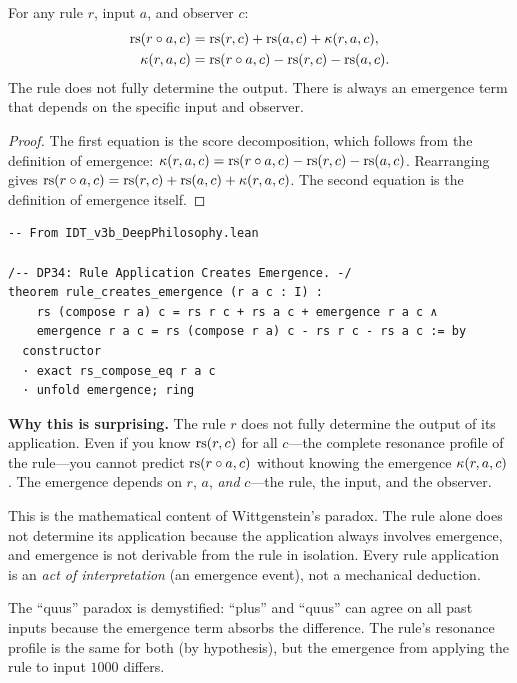 \begin{theorem}
\label{thm:rule-creates-emergence}
For any rule $r$, input $a$, and observer $c$:
\begin{align}
\mathrm{rs}(r \circ a, c) &= \mathrm{rs}(r, c) + \mathrm{rs}(a, c) + \kappa(r, a, c), \\
\kappa(r, a, c) &= \mathrm{rs}(r \circ a, c) - \mathrm{rs}(r, c) - \mathrm{rs}(a, c).
\end{align}
The rule does not fully determine the output.  There is always an
emergence term that depends on the specific input and observer.
\end{theorem}

\begin{proof}
The first equation is the score decomposition, which follows from the
definition of emergence:
$\kappa(r, a, c) = \mathrm{rs}(r \circ a, c) - \mathrm{rs}(r, c) - \mathrm{rs}(a, c)$.
Rearranging gives $\mathrm{rs}(r \circ a, c) = \mathrm{rs}(r, c) + \mathrm{rs}(a, c) + \kappa(r, a, c)$.
The second equation is the definition of emergence itself.
\end{proof}

\begin{lstlisting}
-- From IDT_v3b_DeepPhilosophy.lean

/-- DP34: Rule Application Creates Emergence. -/
theorem rule_creates_emergence (r a c : I) :
    rs (compose r a) c = rs r c + rs a c + emergence r a c ∧
    emergence r a c = rs (compose r a) c - rs r c - rs a c := by
  constructor
  · exact rs_compose_eq r a c
  · unfold emergence; ring
\end{lstlisting}

\begin{surprisebox}
\noindent\textbf{Why this is surprising.}
The rule $r$ does not fully determine the output of its application.
Even if you know $\mathrm{rs}(r, c)$ for all $c$---the complete resonance
profile of the rule---you cannot predict $\mathrm{rs}(r \circ a, c)$
without knowing the emergence $\kappa(r, a, c)$.  The emergence
depends on $r$, $a$, \emph{and} $c$---the rule, the input, and the
observer.

This is the mathematical content of Wittgenstein's paradox.  The rule
alone does not determine its application because the application always
involves emergence, and emergence is not derivable from the rule in
isolation.  Every rule application is an \emph{act of interpretation}
(an emergence event), not a mechanical deduction.

The ``quus'' paradox is demystified: ``plus'' and ``quus'' can agree
on all past inputs because the emergence term absorbs the difference.
The rule's resonance profile is the same for both (by hypothesis), but
the emergence from applying the rule to input $1000$ differs.
\end{surprisebox}

